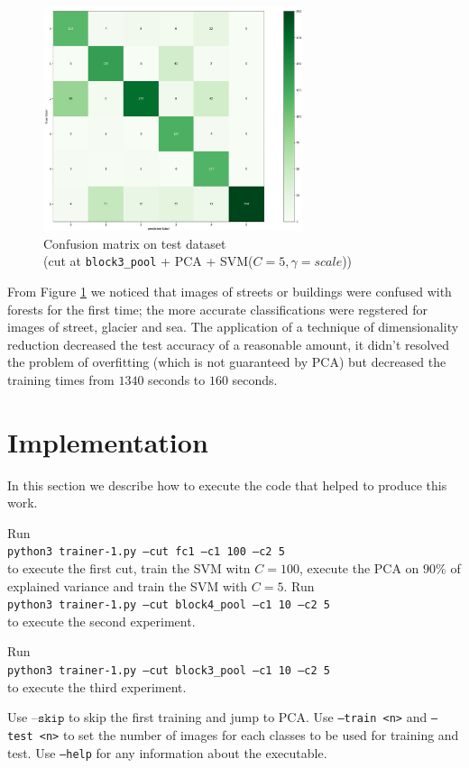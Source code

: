 \documentclass[compsoc]{IEEEtran}
\newcommand{\shellcmd}[1]{\\\indent\texttt{#1}\\}
\begin{document}
\begin{figure}[ht!]
\centering                                                                        
\includegraphics[width=3in]{../images/cm3-pca-test.png}
\captionsetup{justification=centering}                                                                                         
\caption{Confusion matrix on test dataset \\ (cut at \texttt{block3\_pool} + PCA + SVM($C=5, \gamma=scale$))}
\label{fig:cm3-pca-test}                                                                                                                               
\end{figure}

From Figure \ref{fig:cm3-pca-test} we noticed that images of streets or buildings were confused with forests for the first time; the more accurate classifications were regstered for images of street, glacier and sea. 
The application of a technique of dimensionality reduction
decreased the test accuracy of a reasonable amount, it didn't resolved the problem of overfitting (which is not guaranteed by PCA) but decreased the training times from $1340$ seconds to $160$ seconds.


\section{Implementation}
In this section we describe how to execute the code that helped to produce this work. \par
\noindent Run
\shellcmd{python3 trainer-1.py --cut fc1 --c1 100 --c2 5}
to execute the first cut, train the SVM witn $C=100$, execute the PCA on $90\%$ of explained variance and train the SVM with $C=5$. 
\noindent Run
\shellcmd{python3 trainer-1.py --cut block4\_pool --c1 10 --c2 5}
to execute the second experiment. \par
\noindent Run
\shellcmd{python3 trainer-1.py --cut block3\_pool --c1 10 --c2 5}
to execute the third experiment. \par
Use $\texttt{--skip}$ to skip the first training and jump to PCA. Use \texttt{--train <n>} and \texttt{--test <n>} to set the number of images for each classes to be used for training and test. Use \texttt{--help} for any information about the executable.
\end{document}
